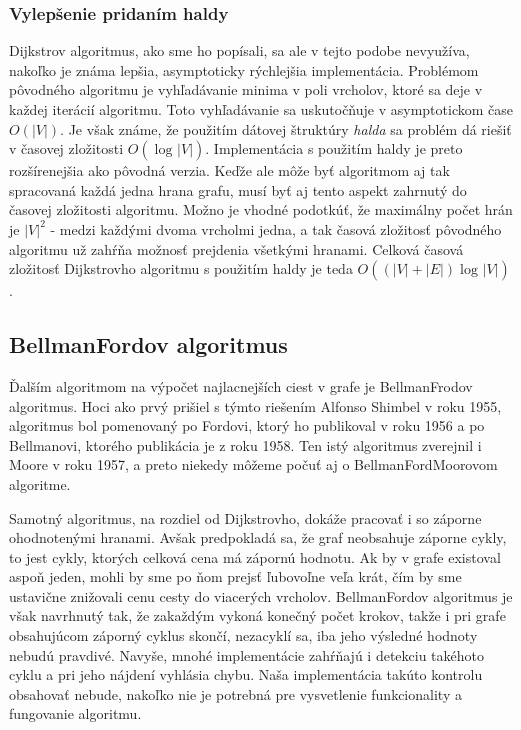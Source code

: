 \subsubsection{Vylepšenie pridaním haldy}

Dijkstrov algoritmus, ako sme ho popísali, sa ale v tejto podobe nevyužíva, nakoľko je známa lepšia, asymptoticky rýchlejšia implementácia. Problémom pôvodného algoritmu je vyhľadávanie minima v poli vrcholov, ktoré sa deje v každej iterácií algoritmu. Toto vyhľadávanie sa uskutočňuje v asymptotickom čase $O(|V|)$. Je však známe, že použitím dátovej štruktúry \textit{halda} sa problém dá riešiť v časovej zložitosti $O(\log_{}|V|)$. Implementácia s použitím haldy je preto rozšírenejšia ako pôvodná verzia. Keďže ale môže byť algoritmom aj tak spracovaná každá jedna hrana grafu, musí byť aj tento aspekt zahrnutý do časovej zložitosti algoritmu. Možno je vhodné podotkúť, že maximálny počet hrán je $|V|^{2}$ - medzi každými dvoma vrcholmi jedna, a tak časová zložitosť pôvodného algoritmu už zahŕňa možnosť prejdenia všetkými hranami. Celková časová zložitosť Dijkstrovho algoritmu s použitím haldy je teda $O((|V| + |E|)\log_{}|V|)$.\newline


\subsection{Bellman\textendash Fordov algoritmus}

Ďalším algoritmom na výpočet najlacnejších ciest v grafe je Bellman\textendash Frodov algoritmus. Hoci ako prvý prišiel s týmto riešením Alfonso Shimbel v roku 1955, algoritmus bol pomenovaný po Fordovi, ktorý ho publikoval v roku 1956 a po Bellmanovi, ktorého publikácia je z roku 1958. Ten istý algoritmus zverejnil i Moore v roku 1957, a preto niekedy môžeme počuť aj o Bellman\textendash Ford\textendash Moorovom algoritme.\newline

Samotný algoritmus, na rozdiel od Dijkstrovho, dokáže pracovať i so záporne ohodnotenými hranami. Avšak predpokladá sa, že graf neobsahuje záporne cykly, to jest cykly, ktorých celková cena má zápornú hodnotu. Ak by v grafe existoval aspoň jeden, mohli by sme po ňom prejsť ľubovoľne veľa krát, čím by sme ustavične znižovali cenu cesty do viacerých vrcholov. Bellman\textendash Fordov algoritmus je však navrhnutý tak, že zakaždým vykoná konečný počet krokov, takže i pri grafe obsahujúcom záporný cyklus skončí, nezacyklí sa, iba jeho výsledné hodnoty nebudú pravdivé. Navyše, mnohé implementácie zahŕňajú i detekciu takéhoto cyklu a pri jeho nájdení vyhlásia chybu. Naša implementácia takúto kontrolu obsahovať nebude, nakoľko nie je potrebná pre vysvetlenie funkcionality a fungovanie algoritmu.\newline

